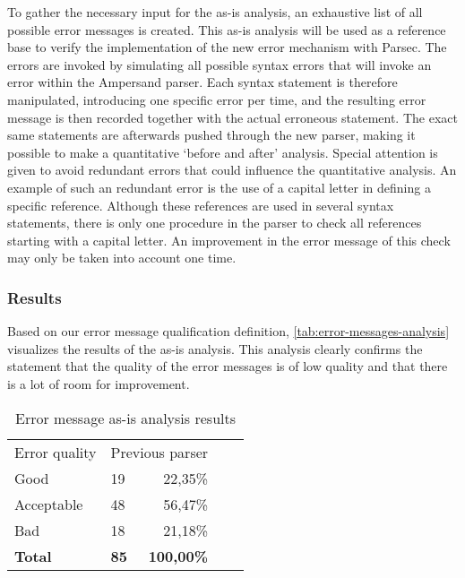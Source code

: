 To gather the necessary input for the as-is analysis, an exhaustive list of all possible error messages is created.
This as-is analysis will be used as a reference base to verify the implementation of the new error mechanism with Parsec.
The errors are invoked by simulating all possible syntax errors that will invoke an error within the Ampersand parser.
Each syntax statement is therefore manipulated, introducing one specific error per time, and the resulting error message is then recorded together with the actual erroneous statement.
The exact same statements are afterwards pushed through the new parser, making it possible to make a quantitative `before and after' analysis.
Special attention is given to avoid redundant errors that could influence the quantitative analysis. 
An example of such an redundant error is the use of a capital letter in defining a specific reference. 
Although these references are used in several syntax statements, there is only one procedure in the parser to check all references starting with a capital letter.
An improvement in the error message of this check may only be taken into account one time.

\subsubsection{Results}
Based on our error message qualification definition, \autoref{tab:error-messages-analysis} visualizes the results of the as-is analysis.
This analysis clearly confirms the statement that the quality of the error messages is of low quality and that there is a lot of room for improvement.

\begin{table}[h]
  \centering
	\begin{tabular}{llrlr}
    Error quality  & \multicolumn{2}{c}{Previous parser}     \\
		Good           & 19          & 22,35\%         \\
		Acceptable        & 48          & 56,47\%       \\
		Bad            & 18          & 21,18\%           \\
		\rowcolor[HTML]{BBBBBB}
		\textbf{Total} & \textbf{85} & \textbf{100,00\%} 
	\end{tabular}
  \caption{Error message as-is analysis results}
  \label{tab:error-messages-analysis}
\end{table}
